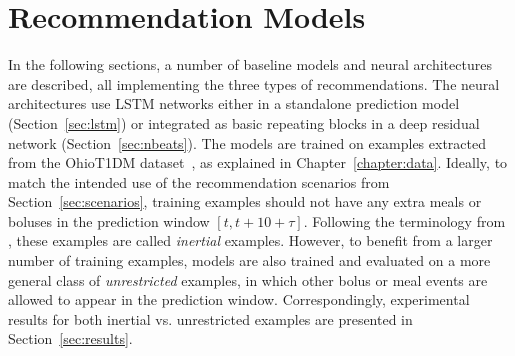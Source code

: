 


\section{Recommendation Models}
\label{sec:models}

In the following sections, a number of baseline models and neural architectures are described, all implementing the three types of recommendations. The neural architectures use \ac{LSTM} networks either in a standalone prediction model (Section~\ref{sec:lstm}) or integrated as basic repeating blocks in a deep residual network (Section~\ref{sec:nbeats}). The models are trained on examples extracted from the OhioT1DM dataset~\cite{ohiot1dm:marling:kdh18}, as explained in Chapter~\ref{chapter:data}. Ideally, to match the intended use of the recommendation scenarios from Section~\ref{sec:scenarios}, training examples should not have any extra meals or boluses in the prediction window $[t, t + 10 + \tau]$. Following the terminology from \cite{mirshekarian:bgl_pred}, these examples are called {\it inertial} examples. However, to benefit from a larger number of training examples, models are also trained and evaluated on a more general class of {\it unrestricted} examples, in which other bolus or meal events are allowed to appear in the prediction window. Correspondingly, experimental results for both inertial vs. unrestricted examples are presented in Section~\ref{sec:results}.

